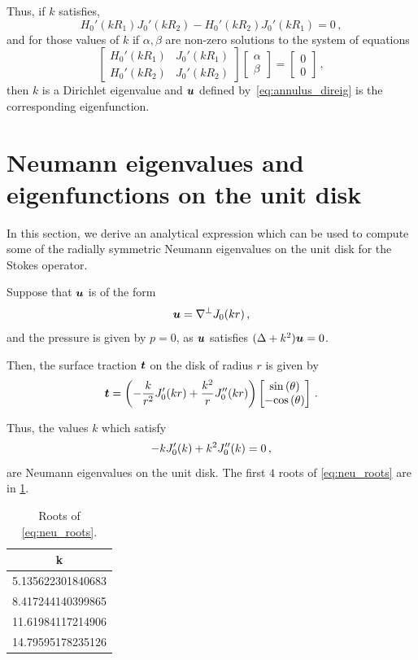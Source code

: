 Thus, if $k$ satisfies, 
\begin{equation}
H_{0}'(kR_{1}) J_{0}'(kR_{2}) - H_{0}'(kR_{2})J_{0}'(kR_{1}) = 0 \, ,
\end{equation}
and for those values of $k$ if 
$\alpha,\beta$ are non-zero solutions to the system of equations 
\begin{equation}
\begin{bmatrix}
H_{0}'(kR_1) & J_{0}'(kR_{1}) \\
H_{0}'(kR_{2}) & J_{0}'(kR_{2}) 
\end{bmatrix}
\begin{bmatrix}
\alpha \\
\beta
\end{bmatrix}
=
\begin{bmatrix}
0 \\
0
\end{bmatrix}
\, ,
\end{equation}
then $k$ is a Dirichlet eigenvalue and ${\boldsymbol u}$ 
defined by~\cref{eq:annulus_direig}
is the corresponding eigenfunction.

\section{Neumann eigenvalues and eigenfunctions on the unit disk}
In this section, we derive an analytical expression which
can be used to compute some of the radially symmetric 
Neumann eigenvalues on the unit disk for the Stokes operator.

Suppose that ${\boldsymbol u}$ is of the form
\begin{equation}
{\boldsymbol u} = \nabla^{\perp} J_{0}(kr) \, ,
\end{equation}
and the pressure is given by $p=0$, as
${\boldsymbol u}$ satisfies $(\Delta + k^2){\boldsymbol u} = 0$.

Then, the surface traction ${\boldsymbol t}$ on the disk of radius $r$ 
is given by
\begin{equation}
{\boldsymbol t} = 
\left( -\frac{k}{r^2}J_{0}'(kr)  + \frac{k^2}{r} J_{0}''(kr)\right)
\begin{bmatrix}
{\sin{(\theta)}} \\
-{\cos{(\theta)}}
\end{bmatrix} \, .
\end{equation}

Thus, the values $k$ which satisfy
\begin{equation}
  \label{eq:neu_roots}
-k J_{0}'(k) + k^2 J_{0}''(k) = 0 \, ,
\end{equation}
are Neumann eigenvalues on the unit disk.
The first $4$ roots of \cref{eq:neu_roots} are
in \cref{tab:neu_roots}.
\begin{table}
  \centering
  \begin{tabular}{c}
    k  \\ \hline
    5.135622301840683 \\
    8.417244140399865 \\
    11.61984117214906 \\
    14.79595178235126 
  \end{tabular}
  \caption{Roots of \cref{eq:neu_roots}.}
  \label{tab:neu_roots}
\end{table}


